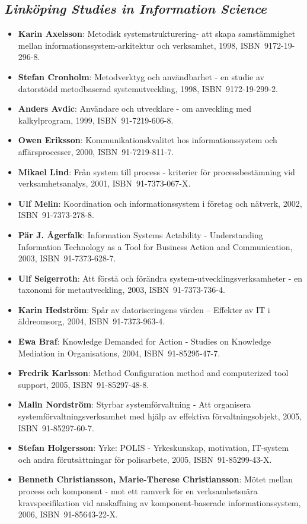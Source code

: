 \documentclass[a4paper,showtrims,twocolumn]{memoir}
\newcommand{\subseries}[1]{\subsection*{\footnotesize\normalfont\textit{#1}}}
\newenvironment{theses}{
  \begin{itemize}
    \setlength{\itemsep}{0.2em}
    \setlength{\parskip}{0em}
    \setlength{\parsep}{0em}
}{
  \end{itemize}
}
\newcommand{\thesis}[5]{\item[No.~#1] \textbf{#2}: #3, #4, ISBN~#5.}
\begin{document}
  \subseries{Linköping Studies in Information Science}

  \begin{theses}
    \thesis{1}{Karin Axelsson}{Metodisk systemstrukturering- att skapa samstämmighet mellan informationssystem-arkitektur och verksamhet}{1998}{9172-19-296-8}
    \thesis{2}{Stefan Cronholm}{Metodverktyg och användbarhet - en studie av datorstödd metodbaserad systemutveckling}{1998}{9172-19-299-2}
    \thesis{3}{Anders Avdic}{Användare och utvecklare - om anveckling med kalkylprogram}{1999}{91-7219-606-8}
    \thesis{4}{Owen Eriksson}{Kommunikationskvalitet hos informationssystem och affärsprocesser}{2000}{91-7219-811-7}
    \thesis{5}{Mikael Lind}{Från system till process - kriterier för processbestämning vid verksamhetsanalys}{2001}{91-7373-067-X}
    \thesis{6}{Ulf Melin}{Koordination och informationssystem i företag och nätverk}{2002}{91-7373-278-8}
    \thesis{7}{Pär J. Ågerfalk}{Information Systems Actability - Understanding Information Technology as a Tool for Business Action and Communication}{2003}{91-7373-628-7}
    \thesis{8}{Ulf Seigerroth}{Att förstå och förändra system-utvecklingsverksamheter - en taxonomi för metautveckling}{2003}{91-7373-736-4}
    \thesis{9}{Karin Hedström}{Spår av datoriseringens värden – Effekter av IT i äldreomsorg}{2004}{91-7373-963-4}
    \thesis{10}{Ewa Braf}{Knowledge Demanded for Action - Studies on Knowledge Mediation in Organisations}{2004}{91-85295-47-7}
    \thesis{11}{Fredrik Karlsson}{Method Configuration method and computerized tool support}{2005}{91-85297-48-8}
    \thesis{12}{Malin Nordström}{Styrbar systemförvaltning - Att organisera systemförvaltningsverksamhet med hjälp av effektiva förvaltningsobjekt}{2005}{91-85297-60-7}
    \thesis{13}{Stefan Holgersson}{Yrke: POLIS - Yrkeskunskap, motivation, IT-system och andra förutsättningar för polisarbete}{2005}{91-85299-43-X}
    \thesis{14}{Benneth Christiansson, Marie-Therese Christiansson}{Mötet mellan process och komponent - mot ett ramverk för en verksamhetsnära kravspecifikation vid anskaffning av komponent-baserade informationssystem}{2006}{91-85643-22-X}
  \end{theses}
\end{document}
